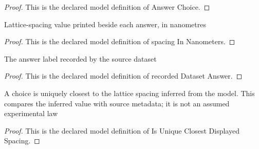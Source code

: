 \begin{proof}
  This is the declared model definition of Answer Choice.
\end{proof}
\begin{definition}
  \label{def:physics:phyx-mini-0532:phyxminiproblems-problemphyxmini0532-answerchoice-spacinginnanometers}
  Lattice-spacing value printed beside each answer, in nanometres
\end{definition}
\begin{proof}
  This is the declared model definition of spacing In Nanometers.
\end{proof}
\begin{definition}
  \label{def:physics:phyx-mini-0532:phyxminiproblems-problemphyxmini0532-recordeddatasetanswer}
  The answer label recorded by the source dataset
\end{definition}
\begin{proof}
  This is the declared model definition of recorded Dataset Answer.
\end{proof}
\begin{definition}
  \label{def:physics:phyx-mini-0532:phyxminiproblems-problemphyxmini0532-isuniqueclosestdisplayedspacing}
  A choice is uniquely closest to the lattice spacing inferred from the model. This compares the inferred value with source metadata; it is not an assumed experimental law
\end{definition}
\begin{proof}
  This is the declared model definition of Is Unique Closest Displayed Spacing.
\end{proof}
